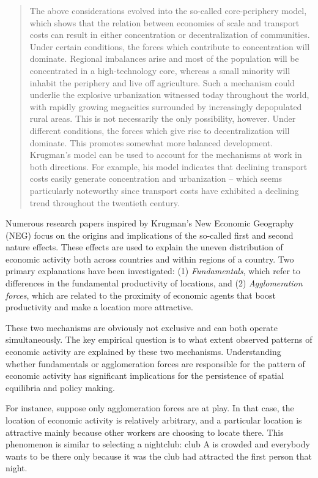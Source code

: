 \documentclass[
  12pt,
  oneside]{book}
\theoremstyle{definition}
\theoremstyle{definition}
\theoremstyle{definition}
\theoremstyle{definition}
\theoremstyle{remark}
\begin{document}
\begin{quote}
The above considerations evolved into the so-called core-periphery model, which shows that the relation between economies of scale and transport costs can result in either concentration or decentralization of communities. Under certain conditions, the forces which contribute to concentration will dominate. Regional imbalances arise and most of the population will be concentrated in a high-technology core, whereas a small minority will inhabit the periphery and live off agriculture. Such a mechanism could underlie the explosive urbanization witnessed today throughout the world, with rapidly growing megacities surrounded by increasingly depopulated rural areas. This is not necessarily the only possibility, however. Under different conditions, the forces which give rise to decentralization will dominate. This promotes somewhat more balanced development. Krugman's model can be used to account for the mechanisms at work in both directions. For example, his model indicates that declining transport costs easily generate concentration and urbanization -- which seems particularly noteworthy since transport costs have exhibited a declining trend throughout the twentieth century.
\end{quote}

Numerous research papers inspired by Krugman's New Economic Geography (NEG) focus on the origins and implications of the so-called first and second nature effects. These effects are used to explain the uneven distribution of economic activity both across countries and within regions of a country. Two primary explanations have been investigated: (1) \emph{Fundamentals}, which refer to differences in the fundamental productivity of locations, and (2) \emph{Agglomeration forces}, which are related to the proximity of economic agents that boost productivity and make a location more attractive.

These two mechanisms are obviously not exclusive and can both operate simultaneously. The key empirical question is to what extent observed patterns of economic activity are explained by these two mechanisms. Understanding whether fundamentals or agglomeration forces are responsible for the pattern of economic activity has significant implications for the persistence of spatial equilibria and policy making.

For instance, suppose only agglomeration forces are at play. In that case, the location of economic activity is relatively arbitrary, and a particular location is attractive mainly because other workers are choosing to locate there. This phenomenon is similar to selecting a nightclub: club A is crowded and everybody wants to be there only because it was the club had attracted the first person that night.
\end{document}

